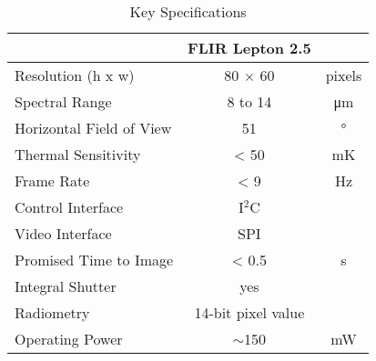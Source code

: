 \begin{table}[htb]
    \centering
    \caption{Key Specifications}
    \label{tab:thcamspecifications}
    \begin{tabular}{l c c}
        \hline
                                                            &   FLIR Lepton 2.5 &          \\
        \hline
        \rowcolor{aliceblue!85} Resolution (h x w)	        &   80 $\times$ 60  &   pixels  \\
        Spectral Range	                                    &   8  to 14        &   \si{\micro\meter}   \\
        \rowcolor{aliceblue!85} Horizontal Field of View	&   51              &   \si{\degree} \\
        Thermal Sensitivity	                                &   < 50            &   \si{\milli\kelvin}  \\
        \rowcolor{aliceblue!85} Frame Rate	                &   < 9             &   \si{\hertz} \\
        Control Interface	                                &   I$^{2}$C        &               \\
        \rowcolor{aliceblue!85} Video Interface	            &   SPI             &               \\
        Promised Time to Image	                            &   < 0.5           &   \si{\second}    \\
        \rowcolor{aliceblue!85} Integral Shutter		    &   yes             &   \\
        Radiometry	                                        &   14-bit pixel value  &           \\
        \rowcolor{aliceblue!85} Operating Power             &	$\sim$150       &   \si{\milli\watt} \\
        \hline
\end{tabular}
\end{table}


